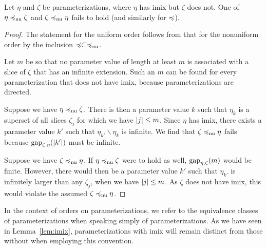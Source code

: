 \begin{lemma}
\label{lem:imix}
  Let $\eta$ and $\zeta$ be parameterizations, where $\eta$ has imix but $\zeta$ does not.
  One of $\eta \preccurlyeq_\mathrm{nu} \zeta$ and $\zeta \preccurlyeq_\mathrm{nu} \eta$ fails to hold (and similarly for $\preccurlyeq$).
\end{lemma}
\begin{proof}
  The statement for the uniform order follows from that for the nonuniform order by the inclusion $\preccurlyeq \subset \preccurlyeq_\mathrm{nu}$.

  Let $m$ be so that no parameter value of length at least $m$ is associated with a slice of $\zeta$ that has an infinite extension.
  Such an $m$ can be found for every parameterization that does not have imix, because parameterizations are directed.

  Suppose we have $\eta \preccurlyeq_\mathrm{nu} \zeta$.
  There is then a parameter value $k$ such that $\eta_k$ is a superset of all slices $\zeta_j$ for which we have ${\lvert j\rvert} \le m$.
  Since $\eta$ has imix, there exists a parameter value $k'$ such that $\eta_{k'} \backslash \eta_k$ is infinite.
  We find that $\zeta \preccurlyeq_\mathrm{nu} \eta$ fails because $\operatorname{gap}_{\zeta, \eta}({\lvert k'\rvert})$ must be infinite.

  Suppose we have $\zeta \preccurlyeq_\mathrm{nu} \eta$.
  If $\eta \preccurlyeq_\mathrm{nu} \zeta$ were to hold as well, $\operatorname{gap}_{\eta, \zeta}(m)$ would be finite.
  However, there would then be a parameter value $k'$ such that $\eta_{k'}$ is infinitely larger than any $\zeta_j$, when we have ${\lvert j\rvert} \le m$.
  As $\zeta$ does not have imix, this would violate the assumed $\zeta \preccurlyeq_\mathrm{nu} \eta$.
\end{proof}

In the context of orders on parameterizations, we refer to the equivalence classes of parameterizations when speaking simply of parameterizations.
As we have seen in Lemma~\ref{lem:imix}, parameterizations with imix will remain distinct from those without when employing this convention.


